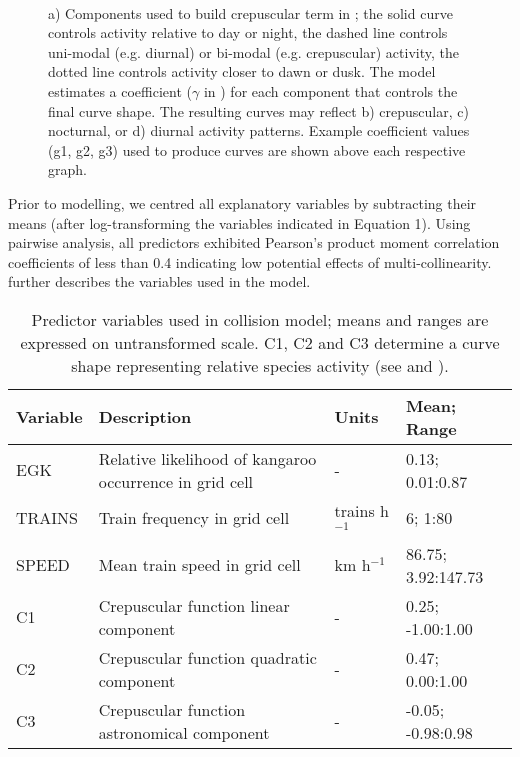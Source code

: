 \begin{figure*}[htp]
  \captionsetup[subfloat]{farskip=-2pt,nearskip=-2pt}
  \centering
  \\
  \caption[Components used to build crepuscular term for kangaroo-train collision model]{a) Components used to build crepuscular term in ; the solid curve controls activity relative to day or night, the dashed line controls uni-modal (e.g. diurnal) or bi-modal (e.g. crepuscular) activity, the dotted line controls activity closer to dawn or dusk. The model estimates a coefficient ($\gamma$ in ) for each component that controls the final curve shape. The resulting curves may reflect b) crepuscular, c) nocturnal, or d) diurnal activity patterns. Example coefficient values (g1, g2, g3) used to produce curves are shown above each respective graph.}
  \label{train_crep}
\end{figure*}

Prior to modelling, we centred all explanatory variables by subtracting their means (after log-transforming the variables indicated in Equation 1). Using pairwise analysis, all predictors exhibited Pearson's product moment correlation coefficients of less than 0.4 indicating low potential effects of multi-collinearity.   further describes the variables used in the model.

\begin{table}[htp]
\caption[Predictor variables used in kangaroo-train collision model]{Predictor variables used in collision model; means and ranges are expressed on untransformed scale.  C1, C2 and C3 determine a curve shape representing relative species activity (see  and ).}
\begin{tabularx}{\textwidth}{llll} \toprule
Variable	&Description												&Units				&Mean; Range \\ \midrule 
EGK			&Relative likelihood of kangaroo occurrence in grid cell	&-					&0.13; 0.01:0.87 \\ 
TRAINS		&Train frequency in grid cell								&trains h$^{-1}$	&6; 1:80 \\ 
SPEED		&Mean train speed in grid cell								&km h$^{-1}$		&86.75; 3.92:147.73 \\ 
C1			&Crepuscular function linear component						&- 					&0.25; -1.00:1.00 \\
C2			&Crepuscular function quadratic component					&-					&0.47; 0.00:1.00 \\
C3			&Crepuscular function astronomical component				&-					&-0.05; -0.98:0.98 \\
\bottomrule
\end{tabularx}
\label{train_predictors}
\end{table}


